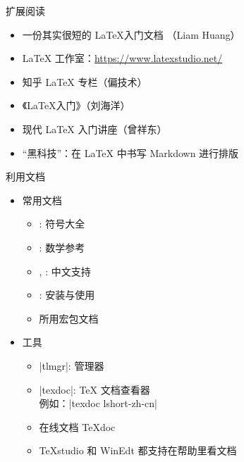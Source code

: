 \begin{frame}{扩展阅读}
  \begin{itemize}
    \item 一份其实很短的 \LaTeX 入门文档 （Liam Huang） 
    \item \LaTeX{} 工作室：\url{https://www.latexstudio.net/}
    \item 知乎 \LaTeX{} 专栏（偏技术）
    \item 《\LaTeX{}入门》（刘海洋）
    \item 现代 LaTeX 入门讲座（曾祥东）
    \item “黑科技”：在 \LaTeX{} 中书写 Markdown 进行排版 
  \end{itemize}
\end{frame}


\begin{frame}[fragile]{利用文档}
  \begin{itemize}
    \item 常用文档
      \begin{itemize}
        \item {}: 符号大全
        \item {}: 数学参考
        \item {}, : 中文支持
        \item {}: \TL 安装与使用
        \item 所用宏包文档
      \end{itemize}
    \item 工具
      \begin{itemize}
        \item |tlmgr|: \TL 管理器
        \item |texdoc|: \TeX{} 文档查看器\\
          例如：|texdoc lshort-zh-cn|
        \item 在线文档 \TeX{}doc 
        \item TeXstudio 和 WinEdt 都支持在帮助里看文档
      \end{itemize}
  \end{itemize}
\end{frame}

